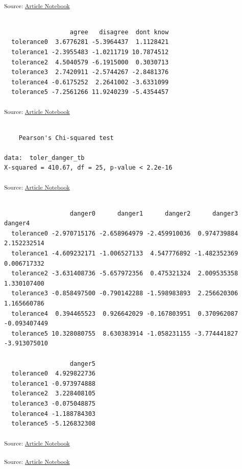 \documentclass[
  letterpaper,
  DIV=11,
  numbers=noendperiod]{scrartcl}
\begin{document}
\textsubscript{Source:
\href{https://h-christy.github.io/data-ethics-final/index.qmd.html}{Article
Notebook}}

\begin{verbatim}
            
                  agree   disagree  dont know
  tolerance0  3.6776281 -5.3964437  1.1128421
  tolerance1 -2.3955483 -1.0211719 10.7874512
  tolerance2  4.5040579 -6.1915000  0.3030713
  tolerance3  2.7420911 -2.5744267 -2.8481376
  tolerance4 -0.6175252  2.2641002 -3.6331099
  tolerance5 -7.2561266 11.9240239 -5.4354457
\end{verbatim}

\textsubscript{Source:
\href{https://h-christy.github.io/data-ethics-final/index.qmd.html}{Article
Notebook}}

\begin{verbatim}

    Pearson's Chi-squared test

data:  toler_danger_tb
X-squared = 410.67, df = 25, p-value < 2.2e-16
\end{verbatim}

\textsubscript{Source:
\href{https://h-christy.github.io/data-ethics-final/index.qmd.html}{Article
Notebook}}

\begin{verbatim}
            
                  danger0      danger1      danger2      danger3      danger4
  tolerance0 -2.970715176 -2.658964979 -2.459910036  0.974739884  2.152232514
  tolerance1 -4.609232171 -1.006527133  4.547776892 -1.482352369  0.006717332
  tolerance2 -3.631408736 -5.657972356  0.475321324  2.009535358  1.330107400
  tolerance3 -0.858497500 -0.790142288 -1.598983893  2.256620306  1.165660786
  tolerance4  0.394465523  0.926642029 -0.167803951  0.370962087 -0.093407449
  tolerance5 10.328080755  8.630383914 -1.058231155 -3.774441827 -3.913075010
            
                  danger5
  tolerance0  4.929822736
  tolerance1 -0.973974888
  tolerance2  3.228408105
  tolerance3 -0.075048875
  tolerance4 -1.188784303
  tolerance5 -5.126832308
\end{verbatim}

\textsubscript{Source:
\href{https://h-christy.github.io/data-ethics-final/index.qmd.html}{Article
Notebook}}

\textsubscript{Source:
\href{https://h-christy.github.io/data-ethics-final/index.qmd.html}{Article
Notebook}}
\end{document}
